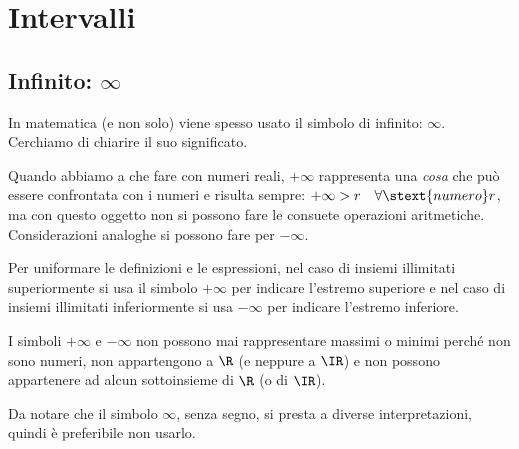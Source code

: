 \section{Intervalli}
\label{sec:topologiaintervalli}

\subsection{Infinito: \(\infty\)}

In matematica (e non solo) viene spesso usato il simbolo di infinito: 
\(\infty\).
Cerchiamo di chiarire il suo significato.


\vspace{.5em}
Quando abbiamo a che fare con numeri reali, \(+\infty\) 
rappresenta una \emph{cosa} che può essere confrontata con i numeri e risulta 
sempre: \quad \(+\infty > r \quad \forall \stext{numero} r\), ma con questo 
oggetto non si possono fare le consuete operazioni aritmetiche. 
Considerazioni analoghe si possono fare per \(-\infty\).

Per uniformare le definizioni e le espressioni, nel caso di insiemi 
illimitati superiormente si usa il simbolo \(+\infty\) 
per indicare l'estremo superiore e 
nel caso di insiemi illimitati inferiormente si usa \(-\infty\) 
per indicare l'estremo inferiore.

I simboli \(+\infty\) e \(-\infty\) non possono mai rappresentare 
massimi o minimi perché non sono numeri, non appartengono a \(\R\) 
(e neppure a \(\IR\))
e non possono appartenere ad alcun sottoinsieme di \(\R\) 
(o di \(\IR\)).

\begin{newoss}{}{}
Da notare che il simbolo \(\infty\), senza segno, si presta a diverse 
interpretazioni, quindi è preferibile non usarlo.
\end{newoss}

